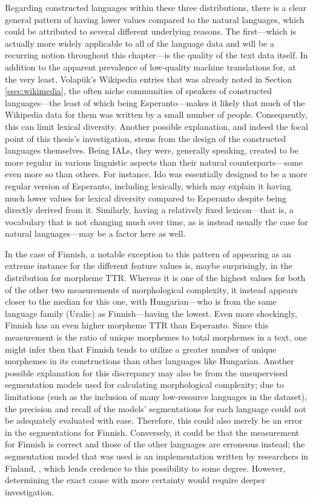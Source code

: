 \documentclass[12pt,a4paper]{article}
\numberwithin{figure}{section}
\numberwithin{table}{section}
\numberwithin{definition}{section}
\begin{document}
Regarding constructed languages within these three distributions, there is a clear general pattern of having lower values compared to the natural languages, which could be attributed to several different underlying reasons. The first---which is actually more widely applicable to all of the language data and will be a recurring notion throughout this chapter---is the quality of the text data itself. In addition to the apparent prevalence of low-quality machine translations for, at the very least, Volapük's Wikipedia entries that was already noted in Section \ref{ssec:wikimedia}, the often niche communities of speakers of constructed languages---the least of which being Esperanto---makes it likely that much of the Wikipedia data for them was written by a small number of people. Consequently, this can limit lexical diversity. Another possible explanation, and indeed the focal point of this thesis's investigation, stems from the design of the constructed languages themselves. Being IALs, they were, generally speaking, created to be more regular in various linguistic aspects than their natural counterparts---some even more so than others. For instance, Ido was essentially designed to be a more regular version of Esperanto, including lexically, which may explain it having much lower values for lexical diversity compared to Esperanto despite being directly derived from it. Similarly, having a relatively fixed lexicon---that is, a vocabulary that is not changing much over time, as is instead usually the case for natural languages---may be a factor here as well.

In the case of Finnish, a notable exception to this pattern of appearing as an extreme instance for the different feature values is, maybe surprisingly, in the distribution for morpheme TTR. Whereas it is one of the highest values for both of the other two measurements of morphological complexity, it instead appears closer to the median for this one, with Hungarian---who is from the same language family (Uralic) as Finnish---having the lowest. Even more shockingly, Finnish has an even higher morpheme TTR than Esperanto. Since this measurement is the ratio of unique morphemes to total morphemes in a text, one might infer then that Finnish tends to utilize a greater number of unique morphemes in its constructions than other languages like Hungarian. Another possible explanation for this discrepancy may also be from the unsupervised segmentation models used for calculating morphological complexity; due to limitations (such as the inclusion of many low-resource languages in the dataset), the precision and recall of the models' segmentations for each language could not be adequately evaluated with ease. Therefore, this could also merely be an error in the segmentations for Finnish. Conversely, it could be that the measurement for Finnish is correct and those of the other languages are erroneous instead; the segmentation model that was used is an implementation written by researchers in Finland, \textcite{Smit2014inproceedings}, which lends credence to this possibility to some degree. However, determining the exact cause with more certainty would require deeper investigation. 
\end{document}
